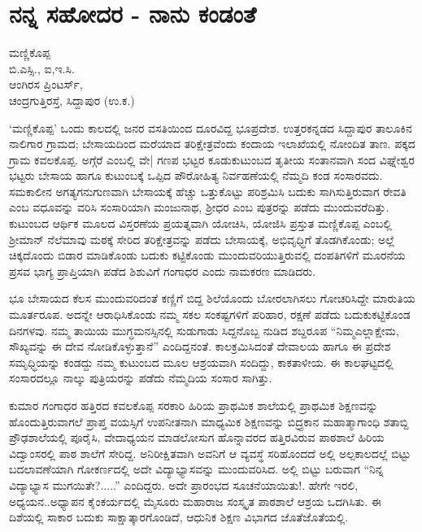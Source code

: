 \chapter{ನನ್ನ  ಸಹೋದರ - ನಾನು ಕಂಡಂತೆ}

\begin{center}
\smallskip

ಮಣ್ಣಿಕೊಪ್ಪ\\
ಬಿ.ಎಸ್ಸಿ., ಐ,ಇ.ಸಿ.\\
ಆಂಗಿರಸ ಪ್ರಿಂಟರ್ಸ್,\\
ಚಂದ್ರಗುತ್ತಿರಸ್ತೆ, ಸಿದ್ದಾಪುರ  (ಉ.ಕ.)
\addrule
\end{center}
`ಮಣ್ಣಿಕೊಪ್ಪ'  ಒಂದು ಕಾಲದಲ್ಲಿ ಜನರ ವಸತಿಯಿಂದ ದೂರವಿದ್ದ ಭೂಪ್ರದೇಶ. ಉತ್ತರಕನ್ನಡದ ಸಿದ್ದಾಪುರ ತಾಲೂಕಿನ  ನಾಲಿಗಾರ ಗ್ರಾಮದ; ಬೇಸಾಯದಿಂದ ಮರೆಯಾದ ತರಿಕ್ಷೇತ್ರವೆಂದು ಕಂದಾಯ ಇಲಾಖೆಯಲ್ಲಿ ನೋಂದಿತ ತಾಣ.  ಪಕ್ಕದ ಗ್ರಾಮ ಕವಲಕೊಪ್ಪ. ಅಗ್ಗೆರೆ ಎಂಬಲ್ಲಿ ವೇ| ಗಣಪ ಭಟ್ಟರ ಕೂಡುಕುಟುಂಬದ ತೃತೀಯ ಸಂತಾನವಾಗಿ ಸಂದ ವಿಘ್ನೇಶ್ವರ ಭಟ್ಟರು ಬೇಸಾಯ ಹಾಗೂ ಕುಟುಂಬಕ್ಕೆ ಒಪ್ಪಿದ ಪೌರೋಹಿತ್ಯ ನಿರ್ವಹಣೆಯಲ್ಲಿ ನೆಮ್ಮದಿ ಕಂಡ ಸಂಸಾರವದು.  ಸಮಕಾಲೀನ ಅಗತ್ಯಗನುಗುಣವಾಗಿ ಬೇಸಾಯಕ್ಕೆ ಹೆಚ್ಚು ಒತ್ತುಕೊಟ್ಟು ಪರಿಶ್ರಮಿಸಿ ಬದುಕು ಸಾಗಿಸುತ್ತಿರುವಾಗ ರೇವತಿ ಎಂಬ ವಧೂವನ್ನು ವರಿಸಿ ಸಂಸಾರಿಯಾಗಿ ಮಂಜುನಾಥ, ಶ್ರೀಧರ ಎಂಬ ಪುತ್ರರನ್ನು  ಪಡೆದು  ಮುಂದುವರೆದಿತ್ತು.  ಕುಟುಂಬದ ಆರ್ಥಿಕ ಮೂಲದ ವಿಸ್ತರಣೆಯ  ಪ್ರಯತ್ನವಾಗಿ  ಯೋಚಿಸಿ, ಯೋಜಿಸಿ  ಪ್ರಸ್ತುತ ಮಣ್ಣಿಕೊಪ್ಪ ಎಂಬಲ್ಲಿ ಶ್ರೀಮಾನ್ ನೆಲೆಮಾವು  ಮಠಕ್ಕೆ ಸೇರಿದ ತರಿಕ್ಷೇತ್ರವನ್ನು  ಪಡೆದು ಬೇಸಾಯಕ್ಕೆ,  ಅಭಿವೃಧ್ಧಿಗೆ ತೊಡಗಿಕೊಂಡು;  ಅಲ್ಲೆ ಚಿಕ್ಕದೊಂದು ಬಿಡಾರ ಮಾಡಿಕೊಂಡು ಬದುಕು ಕಟ್ಟಿಕೊಂಡು ಮುಂದುವರಿಯುತ್ತಿರುವಲ್ಲಿ  ದಂಪತಿಗಳಿಗೆ ಮೂರನೆಯ ಪ್ರಸವ ಭಾಗ್ಯ ಪ್ರಾಪ್ತಿಯಾಗಿ ಪಡೆದ ಶಿಶುವಿಗೆ  ಗಂಗಾಧರ ಎಂದು ನಾಮಕರಣ ಮಾಡಿದರು.

ಭೂ ಬೇಸಾಯದ ಕೆಲಸ ಮುಂದುವರಿದಂತೆ ಕಣ್ಣಿಗೆ ಬಿದ್ದ  ಶಿಲೆಯೊಂದು ಬೋರಲಾಗಿಸಲು ಗೋಚರಿಸಿದ್ದೇ  ಮಾರುತಿಯ  ಮೂರ್ತರೂಪ.  ಅದನ್ನೇ ಆರಾಧಿಸಿಕೊಂಡು  ನಮ್ಮ ಸಕಲ ಸಂಕಷ್ಟಗಳಿಗೆ ಪರಿಹಾರ, ರಕ್ಷಣೆ ಪಡೆದು ಬದುಕುಕಟ್ಟಿಕೊಂಡ ದಿನಗಳವು. ನಮ್ಮ ತಾಯಿಯ ಮುಗ್ಧಮನಸ್ಸಿನಲ್ಲಿ ಸುಡುಗಾಡು ಸಿದ್ದನೊಬ್ಬ ನುಡಿದ ಶಬ್ದರೂಪ ``ನಿಮ್ಮಎಲ್ಲಾಕ್ಷೇಮ, ಸೌಖ್ಯವನ್ನು ಈ ದೇವ ನೋಡಿಕೊಳ್ಳುತ್ತಾನೆ'' ಎಂದಿದ್ದನಂತೆ.  ಕಾಲಕ್ರಮಿಸಿದಂತೆ   ದೇವಾಲಯ ಹಾಗೂ  ಈ ಪ್ರದೇಶ  ಸಮೃಧ್ಧಿಯನ್ನು ಕಂಡದ್ದು ನಮ್ಮ ಕುಟುಂಬದ ಮೂಲ ಆಶ್ರಯವಾಗಿ ಸಂದಿದ್ದು, ಕಾಕತಾಳೀಯ. ಈ ಕಾಲಘಟ್ಟದಲ್ಲಿ  ಸಂಸಾರದಲ್ಲೂ ನಾಲ್ಕು ಪುತ್ರಿಯರನ್ನು  ಪಡೆದು ನೆಮ್ಮದಿಯ ಸಂಸಾರ ಸಾಗಿತ್ತು.	
	
ಕುಮಾರ ಗಂಗಾಧರ ಹತ್ತಿರದ ಕವಲಕೊಪ್ಪ ಸರಕಾರಿ ಹಿರಿಯ ಪ್ರಾಥಮಿಕ ಶಾಲೆಯಲ್ಲಿ ಪ್ರಾಥಮಿಕ ಶಿಕ್ಷಣವನ್ನು ಹೊಂದುತ್ತಿರುವಾಗಲೆ ಪ್ರಾಪ್ತ ವಯಸ್ಸಿಗೆ ಉಪನೀತನಾಗಿ  ಮಾಧ್ಯಮಿಕ ಶಿಕ್ಷಣವನ್ನು ಬಿದ್ರ್ರಕಾನ ಮಹಾತ್ಮಾಗಾಂಧಿ ಶತಾಬ್ದಿ ಪ್ರೌಢಶಾಲೆಯಲ್ಲಿ ಪೂರೈಸಿ, ವೇದಾಧ್ಯಯನ ಮಾಡಲೋಸುಗ ಹೊನ್ನಾವರದ ಹತ್ತಿರವಿರುವ ಪಾಠಶಾಲೆ ಹಿರಿಯ ವಿದ್ವಾಂಸರಲ್ಲಿ ಪಾಠ ಶಾಲೆಗೆ ಸೇರಿದ್ದ.  ಅನಿರೀಕ್ಷಿತವಾಗಿ ಅವನಿಗೆ ಆ ವ್ಯವಸ್ಥೆ ಸರಿಹೊಂದದೆ ಅಲ್ಲಿ ಅಲ್ಪಕಾಲದಲ್ಲೆ ಬಿಟ್ಟು ಬದಲಾವಣೆಯಾಗಿ ಗೋಕರ್ಣದಲ್ಲಿ ಅದೇ ವಿದ್ಯಾಭ್ಯಾಸವನ್ನು ಮುಂದುವರಿಸಿದ. ಅಲ್ಲಿ ಬಿಟ್ಟು  ಬರುವಾಗ ``ನಿನ್ನ ವಿದ್ಯಾಭ್ಯಾಸ ಮುಗಯಿತೇ?.....'' ಎಂದಿದ್ದರು. ಅದೇ ಪ್ರಾರಂಭದ  ಸೂಚನೆಯಾಯಿತು!.  ಹೇಗೇ ಇರಲಿ, ಅಧ್ಯಯನ..ಅಧ್ಯಾಪನ ಕೈಂಕರ್ಯದಲ್ಲಿ  ಮೈಸೂರು ಮಹಾರಾಜ ಸಂಸ್ಕೃತ ಪಾಠಶಾಲೆ ಆಶ್ರಯ ಒದಗಿಸಿತು. ಈ ದಿಶೆಯಲ್ಲಿ  ಸಾಕಾರ  ಬದುಕು ಸಾಕ್ಷಾತ್ಕಾರಗೊಂಡಿದೆ, ಆಧುನಿಕ ಶಿಕ್ಷಣ ವಿಭಾಗದ ಜೊತೆಜೊತೆಯಲ್ಲಿ.

